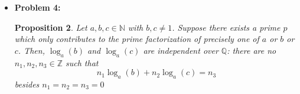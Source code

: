 \documentclass[12pt, reqno]{amsart}
\newtheorem{prop}{Proposition}[section]
\theoremstyle{definition}
\theoremstyle{remark}
\begin{document}
\begin{itemize}
\begin{itemize}
\vspace{0.1 cm}
\item[(c)] 

\begin{prop}
    For every $x\in[0,1]$, $R_\alpha^n(x)\in I$ for infinitely many $n\in\mathbb N$.
\end{prop}

\begin{proof}
    Let $M\in \mathbb{N}$ and $x\in[0,1]$ be given. Divide $I$ into $M$ subintervals: $$I_{i}=\left(a+\frac{i \epsilon}{M},a+ \frac{(i+1)\epsilon}{M}\right),\text{ for }0\le i< M$$and $$I_{M}=\left(b- \frac{\epsilon}{M},b\right)$$By Kronecker's Theorem, for each $0\le i< M$, there exists $n_{i}\in \mathbb{N}$ such that $$R^{n_{i}}_{\alpha}(x)\in I_{i}\subseteq I$$Note that $n_{i}\ne n_{j}$ for all $i\ne j$, since $I_{i}\cap I_{j}=\emptyset$. We have shown that $$\#(\mathcal{O}_{\alpha}(x)\cap I)\ge M$$Since $M$ was arbitrary, $R^{n}_{\alpha}(x)\in I$ for infinitely many $n$.  
\end{proof}


\end{itemize}

\vspace{0.2 cm}
\item {\bf{Problem 4:}} %


\begin{prop}
    Let $a,b,c\in \mathbb{N}$ with $b,c\ne1$. Suppose there exists a prime $p$ which only contributes to the prime factorization of precisely one of $a$ or $b$ or $c$. Then, $\log_{a}(b)$ and $\log_{a}(c)$ are independent over $\mathbb{Q}$: there are no $n_{1},n_{2},n_{3}\in\mathbb{Z}$ such that 
    \[
        n_{1}\log_{a}(b)+n_{2}\log_{a}(c)=n_{3}
    \]besides $n_{1}=n_{2}=n_{3}=0$
\end{prop}


\end{itemize}
\end{document}
